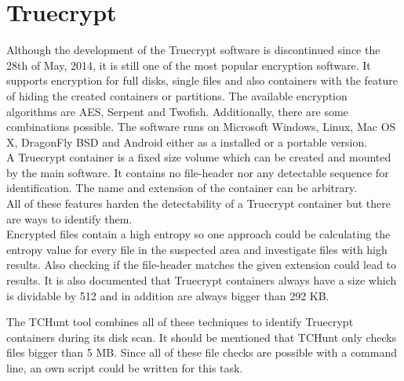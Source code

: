 \section{Truecrypt}
Although the development of the Truecrypt software is discontinued since the 28th of May, 2014, it is still one of the most popular encryption software.
It supports encryption for full disks, single files and also containers with the feature of hiding the created containers or partitions.
The available encryption algorithms are AES, Serpent and Twofish. Additionally, there are some combinations possible.
The software runs on Microsoft Windows, Linux, Mac OS X, DragonFly BSD and Android either as a installed or a portable version.\cite{wiki:truecrypt}\\

A Truecrypt container is a fixed size volume which can be created and mounted by the main software.
It contains no file-header nor any detectable sequence for identification.
The name and extension of the container can be arbitrary.\\

All of these features harden the detectability of a Truecrypt container but there are ways to identify them.\\

Encrypted files contain a high entropy so one approach could be calculating the entropy value for every file in the suspected area and investigate files with high results.
Also checking if the file-header matches the given extension could lead to results.
It is also documented that Truecrypt containers always have a size which is dividable by 512 and in addition are always bigger than 292 KB.\cite{truecrypt:sourceCode}

The TCHunt tool combines all of these techniques to identify Truecrypt containers during its disk scan. It should be mentioned that TCHunt only checks files bigger than 5 MB.
Since all of these file checks are possible with a command line, an own script could be written for this task.
